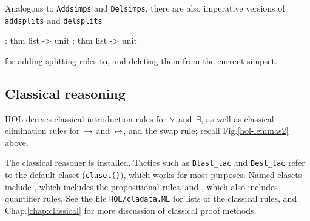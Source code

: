 Analogous to \texttt{Addsimps} and \texttt{Delsimps}, there are also
imperative versions of \texttt{addsplits} and \texttt{delsplits}
\begin{ttbox}
: thm list -> unit
: thm list -> unit
\end{ttbox}
for adding splitting rules to, and deleting them from the current simpset.

\subsection{Classical reasoning}

HOL derives classical introduction rules for $\vee$ and~$\exists$, as well as
classical elimination rules for~$\rightarrow$ and~$\leftrightarrow$, and the swap rule; recall
Fig.\ts\ref{hol-lemmas2} above.

The classical reasoner is installed.  Tactics such as \texttt{Blast_tac} and
{\tt Best_tac} refer to the default claset (\texttt{claset()}), which works
for most purposes.  Named clasets include , which
includes the propositional rules, and , which also
includes quantifier rules.  See the file \texttt{HOL/cladata.ML} for lists of
the classical rules,
and %
{Chap.\ts\ref{chap:classical}} for more discussion of classical proof methods.





